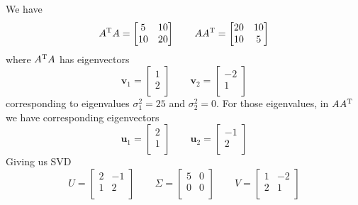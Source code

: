 \documentclass[a4paper]{article}
\begin{document}
\vspace{12pt}


We have
\[
	A^{\textsc{T}}A = 
	\begin{bmatrix}
		5 & 10 \\
		10 & 20 \\
	\end{bmatrix}
	\qquad
	AA^{\textsc{T}} = 
	\begin{bmatrix}
		20 & 10 \\
		10 & 5 \\
	\end{bmatrix}
\]
where \(A^{\textsc{T}}A\) has eigenvectors
\[
	\bm{v}_{1} =
	\begin{bmatrix}
		1 \\
		2 \\
	\end{bmatrix}
	\qquad
	\bm{v}_{2} = 
	\begin{bmatrix}
		-2 \\
		1 \\
	\end{bmatrix}
\]
corresponding to eigenvalues \(\sigma_{1}^{2} = 25\) and \(\sigma_{2}^{2} = 0\). For those eigenvalues, in \(AA^{\textsc{T}}\) we have corresponding eigenvectors
\[
	\bm{u}_{1} =
	\begin{bmatrix}
		2 \\
		1 \\
	\end{bmatrix}
	\qquad
	\bm{u}_{2} =
	\begin{bmatrix}
		-1 \\
		2 \\
	\end{bmatrix}
\]
Giving us SVD
\[
	U =
	\begin{bmatrix}
		2 & -1 \\
		1 & 2 \\
	\end{bmatrix}
	\qquad
	\Sigma =
	\begin{bmatrix}
		5 & 0 \\
		0 & 0 \\
	\end{bmatrix}
	\qquad
	V = 
	\begin{bmatrix}
		1 & -2 \\
		2 & 1 \\
	\end{bmatrix}
\]
\end{document}
